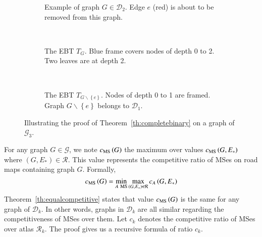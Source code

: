 \documentclass[preprint]{elsarticle}
\newcommand{\set}[1]{\left\{ #1 \right\}}
\newcommand{\mcalg}{\mathcal{G}}
\newcommand{\mcalr}{\mathcal{R}}
\newcommand{\mcald}{\mathcal{D}}
\newcommand{\mts}{MS}
\newcommand{\cms}{c_{\mbox{\scriptsize{MS}}}}
\begin{document}
\begin{figure}[h]
\centering
\begin{subfigure}[b]{0.3\columnwidth}
\centering
\scalebox{.40}{}
\caption{Example of graph $G \in \mcald_2$. Edge $e$ (red) is about to be removed from this graph.}
\label{subfig:proofth1_a}
\end{subfigure}
~
\begin{subfigure}[b]{0.3\columnwidth}
\centering
\scalebox{.55}{}
\caption{The EBT $T_{G}$. Blue frame covers nodes of depth 0 to 2. Two leaves are at depth 2.}
\label{subfig:proofth1_b}
\end{subfigure}
~
\begin{subfigure}[b]{0.3\columnwidth}
\centering
\scalebox{.55}{}
\caption{The EBT $T_{G \backslash \set{e}}$. Nodes of depth 0 to 1 are framed. Graph $G\backslash \set{e}$ belongs to $\mcald_1$.}
\label{subfig:proofth1_c}
\end{subfigure}
\caption{Illustrating the proof of Theorem~\ref{th:completebinary} on a graph of $\mcalg_3$.}
\label{fig:proofth1}
\end{figure}


For any graph $G \in \mcalg$, we note $\cms\left(G\right)$ the maximum over values $\cms\left(G,E_*\right)$ where $\left(G,E_*\right) \in \mcalr$. This value represents the competitive ratio of \mts es on road maps containing graph $G$. Formally, 
\begin{equation}
\cms\left(G\right) = \min\limits_{A ~\mbox{\scriptsize {MS}}} \max\limits_{\left(G,E_*\right) \in \mcalr} c_A\left(G,E_*\right)
\label{eq:cmsg}
\end{equation}
Theorem~\ref{th:equalcompetitive} states that value $\cms\left(G\right)$ is the same for any graph of $\mcald_k$. In other words, graphs in $\mcald_k$ are all similar regarding the competitiveness of \mts es over them. Let $c_k$ denotes the competitive ratio of \mts es over atlas $\mcalr_k$. The proof gives us a recursive formula of ratio $c_k$.
\end{document}
